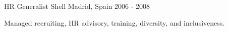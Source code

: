 \begin{cventries}
   \cventry
    {HR Generalist} %
    {Shell} %
    {Madrid, Spain} %
    {2006 - 2008} %
    {
      \begin{cvitems} %
        \item {Managed recruiting, HR advisory, training, diversity, and inclusiveness.}
      \end{cvitems}
    }
\end{cventries}
